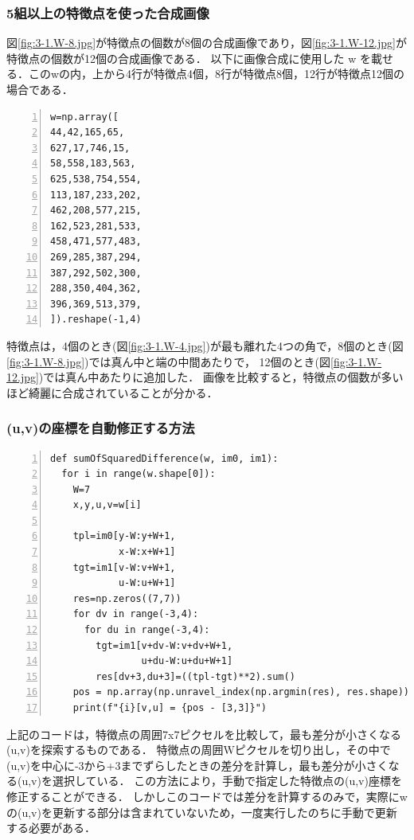 \documentclass[autodetect-engine,dvi=dvipdfmx,ja=standard,
               a4j,11pt]{bxjsarticle}
\begin{document}
\subsubsection{5組以上の特徴点を使った合成画像}
図\ref{fig:3-1.W-8.jpg}が特徴点の個数が8個の合成画像であり，図\ref{fig:3-1.W-12.jpg}が特徴点の個数が12個の合成画像である．
以下に画像合成に使用した w を載せる．このwの内，上から4行が特徴点4個，8行が特徴点8個，12行が特徴点12個の場合である．

\begin{Verbatim}[numbers=left, xleftmargin=10mm, numbersep=6pt,
                    fontsize=\small, baselinestretch=0.8]
  w=np.array([
44,42,165,65,
627,17,746,15,
58,558,183,563,
625,538,754,554,
113,187,233,202,
462,208,577,215,
162,523,281,533,
458,471,577,483,
269,285,387,294,
387,292,502,300,
288,350,404,362,
396,369,513,379,
]).reshape(-1,4)
\end{Verbatim}

特徴点は，4個のとき(図\ref{fig:3-1.W-4.jpg})が最も離れた4つの角で，8個のとき(図\ref{fig:3-1.W-8.jpg})では真ん中と端の中間あたりで，
12個のとき(図\ref{fig:3-1.W-12.jpg})では真ん中あたりに追加した．
画像を比較すると，特徴点の個数が多いほど綺麗に合成されていることが分かる．

\subsubsection{(u,v)の座標を自動修正する方法}
\begin{Verbatim}[numbers=left, xleftmargin=10mm, numbersep=6pt,
                    fontsize=\small, baselinestretch=0.8]
def sumOfSquaredDifference(w, im0, im1):
  for i in range(w.shape[0]):
    W=7
    x,y,u,v=w[i]

    tpl=im0[y-W:y+W+1,
            x-W:x+W+1]
    tgt=im1[v-W:v+W+1,
            u-W:u+W+1]
    res=np.zeros((7,7))
    for dv in range(-3,4):
      for du in range(-3,4):
        tgt=im1[v+dv-W:v+dv+W+1,
                u+du-W:u+du+W+1]
        res[dv+3,du+3]=((tpl-tgt)**2).sum()
    pos = np.array(np.unravel_index(np.argmin(res), res.shape))
    print(f"{i}[v,u] = {pos - [3,3]}")
\end{Verbatim}
上記のコードは，特徴点の周囲7x7ピクセルを比較して，最も差分が小さくなる(u,v)を探索するものである．
特徴点の周囲Wピクセルを切り出し，その中で(u,v)を中心に-3から+3までずらしたときの差分を計算し，最も差分が小さくなる(u,v)を選択している．
この方法により，手動で指定した特徴点の(u,v)座標を修正することができる．
しかしこのコードでは差分を計算するのみで，実際にwの(u,v)を更新する部分は含まれていないため，一度実行したのちに手動で更新する必要がある．
\end{document}

